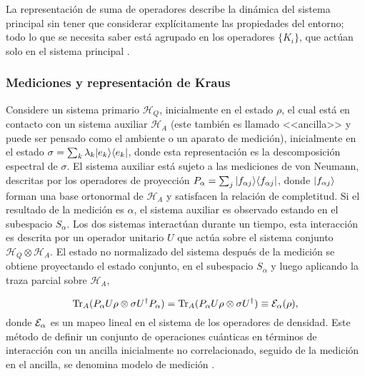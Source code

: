 La representación de suma de operadores describe la dinámica del sistema principal sin tener que considerar explícitamente las propiedades del entorno; todo lo que se necesita saber está agrupado en los operadores $\{K_i\}$, que actúan solo en el sistema principal {\cite{nielsen_chuang_2010}}.


\subsubsection{Mediciones y representación de Kraus}\label{subsubsec:Medicion_RepresentacionDeKraus} %

Considere un sistema primario $\mathcal{H}_Q$, inicialmente en el estado
$\rho$,  el cual está en contacto con un sistema auxiliar $\mathcal{H}_A$
(este también es llamado <<ancilla>> y puede ser pensado como el ambiente o un
aparato de medición), inicialmente en el estado $\sigma=\sum_k \lambda_k
|e_k\rangle \langle e_k|$, donde esta representación es la descomposición espectral de
$\sigma$. El sistema auxiliar está sujeto a las mediciones de von Neumann,
descritas por los operadores de proyección $P_\alpha=\sum_j |f_{\alpha j}\rangle \langle
f_{\alpha j}|$,  donde $|f_{\alpha j}\rangle$ forman una base ortonormal de
$\mathcal{H}_A$ y satisfacen la relación de completitud. Si el resultado de la
medición es $\alpha$, el sistema auxiliar es observado estando en el subespacio
$S_\alpha$. Los dos sistemas interactúan durante un tiempo, esta interacción es
descrita por un operador unitario $U$ que actúa sobre el sistema conjunto
$\mathcal{H}_Q\otimes \mathcal{H}_A$. El estado no normalizado del sistema
después de la medición se obtiene proyectando el estado conjunto, en el
subespacio $S_\alpha$ y luego aplicando la traza parcial sobre $\mathcal{H}_A$,

\begin{equation}\label{measurement_model}
    {\rm Tr}_A(P_\alpha U \rho \otimes \sigma U^\dagger P_\alpha)= {\rm Tr}_A(P_\alpha U \rho \otimes \sigma U^\dagger)\equiv \mathcal{E}_\alpha(\rho),
\end{equation} 
donde $\mathcal{E}_\alpha$ es un mapeo lineal en el sistema de los operadores de
densidad. Este método de definir un conjunto de operaciones cuánticas en
términos de interacción con un ancilla inicialmente no correlacionado, seguido
de la medición en el ancilla, se denomina modelo de medición {\cite{unm2014,
nielsen_chuang_2010}}.

